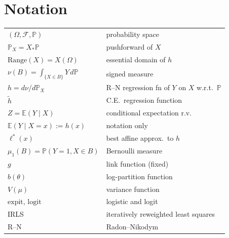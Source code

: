 \documentclass[12pt, a4paper]{article}
\theoremstyle{definition}
\newcommand{\E}{\mathbb{E}}
\newcommand{\Prob}{\mathbb{P}}
\newcommand{\sF}{\mathcal{F}}
\newcommand{\expit}{\mathrm{expit}}
\newcommand{\logit}{\mathrm{logit}}
\newcommand{\Range}{\mathrm{Range}}
\begin{document}
\section{Notation}
\begin{tabular}{@{}ll@{}}
$(\Omega,\sF,\Prob)$ & probability space \\
$\Prob_X=X_*\Prob$ & pushforward of $X$ \\
$\Range(X)=X(\Omega)$ & essential domain of $h$ \\
$\nu(B)=\int_{\{X\in B\}}Y\,d\Prob$ & signed measure \\
$h=d\nu/d\Prob_X$ & R--N regression fn of $Y$ on $X$ w.r.t.\ $\Prob$ \\
$\tilde h$ & C.E.\ regression function \\
$Z=\E(Y\mid X)$ & conditional expectation r.v. \\
$\E(Y\mid X=x):=h(x)$ & notation only \\
$\ell^*(x)$ & best affine approx.\ to $h$ \\
$\mu_1(B)=\Prob(Y=1,X\in B)$ & Bernoulli measure \\
$g$ & link function (fixed) \\
$b(\theta)$ & log-partition function \\
$V(\mu)$ & variance function \\
$\expit$, $\logit$ & logistic and logit \\
IRLS & iteratively reweighted least squares \\
R--N & Radon--Nikodym \\
\end{tabular}
\end{document}
